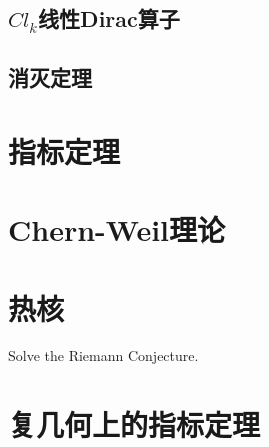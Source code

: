 \section{$Cl_k$线性Dirac算子}
\section{消灭定理}
\chapter{指标定理}

\chapter{Chern-Weil理论}
\chapter{热核}



\begin{problemset}
  \item Solve the Riemann Conjecture.
\end{problemset}


\chapter{复几何上的指标定理}
\ifx\allfiles\undefined
	
	
	
	
	\else
	\fi